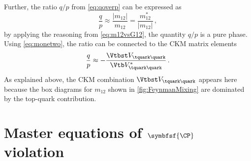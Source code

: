 Further, the ratio $q/p$ from \cref{eq:qoverp} can be expressed as
\begin{equation}
\frac{q}{p}\approx\frac{\left|m_{12}\right|}{m_{12}}=\frac{m_{12}^\ast}{\left|m_{12}\right|}\,,\label{eq:qoverPPurePhase}
\end{equation}
by applying the reasoning from \cref{eq:m12vsG12}, \ie the quantity $q/p$ is a pure phase.
Using \cref{eq:monetwo}, the ratio can be connected to the CKM matrix elements
\begin{equation}
\frac{q}{p}\approx-\frac{\Vtbst V_{\tquark\quark}}{\Vtb V_{\tquark\quark}^\ast}\label{eq:qoverpCKM}\,.
\end{equation}
As explained above, the CKM combination $\Vtbst V_{\tquark\quark}$ appears here because the box diagrams for $m_{12}$ shown in \cref{fig:FeynmanMixing} are dominated by the top-quark contribution.

\section[head={Master equations of \CP violation},tocentry={Master equations of \CP violation}]{Master equations of $\symbfsf{\CP}$ violation}
\label{sec:formulaeCPV}

